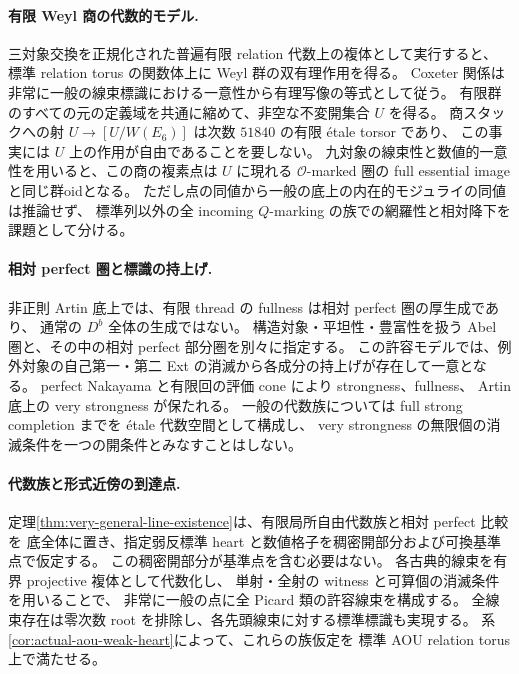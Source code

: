 \documentclass[11pt,a4paper]{ltjsarticle}
\theoremstyle{definition}\newtheorem{remark}[theorem]{注意}
\begin{document}
\paragraph{有限 Weyl 商の代数的モデル.}
三対象交換を正規化された普遍有限 relation 代数上の複体として実行すると、
標準 relation torus の関数体上に Weyl 群の双有理作用を得る。
Coxeter 関係は非常に一般の線束標識における一意性から有理写像の等式として従う。
有限群のすべての元の定義域を共通に縮めて、非空な不変開集合 $U$ を得る。
商スタックへの射 $U\to[U/W(E_6)]$ は次数 $51840$ の有限 \'etale torsor であり、
この事実には $U$ 上の作用が自由であることを要しない。
九対象の線束性と数値的一意性を用いると、この商の複素点は
$U$ に現れる $\mathcal O$-marked 圏の full essential image と同じ群oidとなる。
ただし点の同値から一般の底上の内在的モジュライの同値は推論せず、
標準列以外の全 incoming $Q$-marking の族での網羅性と相対降下を課題として分ける。

\paragraph{相対 perfect 圏と標識の持上げ.}
非正則 Artin 底上では、有限 thread の fullness は相対 perfect 圏の厚生成であり、
通常の $D^b$ 全体の生成ではない。
構造対象・平坦性・豊富性を扱う Abel 圏と、その中の相対 perfect 部分圏を別々に指定する。
この許容モデルでは、例外対象の自己第一・第二 Ext の消滅から各成分の持上げが存在して一意となる。
perfect Nakayama と有限回の評価 cone により strongness、fullness、
Artin 底上の very strongness が保たれる。
一般の代数族については full strong completion までを \'etale 代数空間として構成し、
very strongness の無限個の消滅条件を一つの開条件とみなすことはしない。


\paragraph{代数族と形式近傍の到達点.}
定理\ref{thm:very-general-line-existence}は、有限局所自由代数族と相対 perfect 比較を
底全体に置き、指定弱反標準 heart と数値格子を稠密開部分および可換基準点で仮定する。
この稠密開部分が基準点を含む必要はない。
各古典的線束を有界 projective 複体として代数化し、
単射・全射の witness と可算個の消滅条件を用いることで、
非常に一般の点に全 Picard 類の許容線束を構成する。
全線束存在は零次数 root を排除し、各先頭線束に対する標準標識も実現する。
系\ref{cor:actual-aou-weak-heart}によって、これらの族仮定を
標準 AOU relation torus 上で満たせる。
\end{document}
